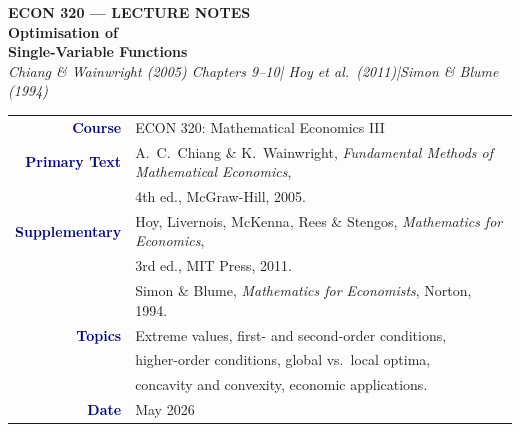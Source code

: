 \documentclass[12pt, a4paper]{article}
\theoremstyle{definition}
\begin{document}

\thispagestyle{empty}

\vspace*{-1.7cm}
\begin{center}
  {\color{white}\large\bfseries\sffamily ECON 320 --- LECTURE NOTES}\\[10pt]
  {\color{white}\Huge\bfseries Optimisation of}\\[6pt]
  {\color{white}\Huge\bfseries Single-Variable Functions}\\[10pt]
  {\color{gold}\large\itshape
   Chiang \& Wainwright (2005) Chapters 9--10\quad|\quad
   Hoy et al.\ (2011)\quad|\quad Simon \& Blume (1994)}
\end{center}

\vspace{3.8cm}
\begin{center}
\begin{tabular}{r l}
  \textbf{\textcolor{navy}{Course}}
    & ECON 320: Mathematical Economics III \\[3pt]
  \textbf{\textcolor{navy}{Primary Text}}
    & A.\ C.\ Chiang \& K.\ Wainwright,
      \textit{Fundamental Methods of Mathematical Economics},\\
    & 4th ed., McGraw-Hill, 2005. \\[3pt]
  \textbf{\textcolor{navy}{Supplementary}}
    & Hoy, Livernois, McKenna, Rees \& Stengos,
      \textit{Mathematics for Economics},\\
    & 3rd ed., MIT Press, 2011.\\[2pt]
    & Simon \& Blume,
      \textit{Mathematics for Economists}, Norton, 1994.\\[3pt]
  \textbf{\textcolor{navy}{Topics}}
    & Extreme values, first- and second-order conditions,\\
    & higher-order conditions, global vs.\ local optima,\\
    & concavity and convexity, economic applications.\\[3pt]
  \textbf{\textcolor{navy}{Date}} & May 2026 \\
\end{tabular}
\end{center}
\end{document}
